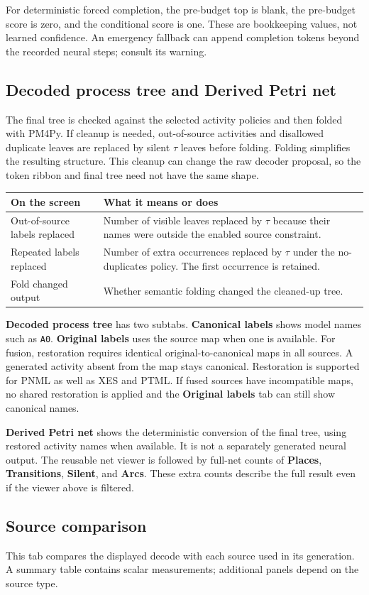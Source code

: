 \documentclass[11pt,a4paper]{article}
\makeatletter
\newcommand{\ui}[1]{\textbf{#1}}
\newcommand{\code}[1]{\nolinkurl{#1}}
\newenvironment{controls}{%
  \small\begin{longtable}{@{}>{\raggedright\arraybackslash}p{.34\linewidth}
    >{\raggedright\arraybackslash}p{.62\linewidth}@{}}
  \toprule\textbf{On the screen} & \textbf{What it means or does}\\\midrule\endhead
  \bottomrule\endfoot
}{\end{longtable}\normalsize}
\makeatother
\begin{document}
For deterministic forced completion, the pre-budget top is blank, the
pre-budget score is zero, and the conditional score is one. These are
bookkeeping values, not learned confidence. An emergency fallback can append
completion tokens beyond the recorded neural steps; consult its warning.

\subsection{Decoded process tree and Derived Petri net}
The final tree is checked against the selected activity policies and then
folded with PM4Py. If cleanup is needed, out-of-source activities and disallowed
duplicate leaves are replaced by silent $\tau$ leaves before folding. Folding
simplifies the resulting structure. This cleanup can change the raw decoder
proposal, so the token ribbon and final tree need not have the same shape.

\begin{controls}
Out-of-source labels replaced & Number of visible leaves replaced by $\tau$
because their names were outside the enabled source constraint.\\
Repeated labels replaced & Number of extra occurrences replaced by $\tau$
under the no-duplicates policy. The first occurrence is retained.\\
Fold changed output & Whether semantic folding changed the cleaned-up tree.\\
\end{controls}

\ui{Decoded process tree} has two subtabs. \ui{Canonical labels} shows model
names such as \code{A0}. \ui{Original labels} uses the source map when one is
available. For fusion, restoration requires identical original-to-canonical
maps in all sources. A generated activity absent from the map stays canonical.
Restoration is supported for PNML as well as XES and PTML. If fused sources
have incompatible maps, no shared restoration is applied and the
\ui{Original labels} tab can still show canonical names.

\ui{Derived Petri net} shows the deterministic conversion of the final tree,
using restored activity names when available. It is not a separately generated
neural output. The reusable net
viewer is followed by full-net counts of \ui{Places}, \ui{Transitions},
\ui{Silent}, and \ui{Arcs}. These extra counts describe the full result even
if the viewer above is filtered.

\subsection{Source comparison}
This tab compares the displayed decode with each source used in its generation.
A summary table contains scalar measurements; additional panels depend on the
source type.
\end{document}
